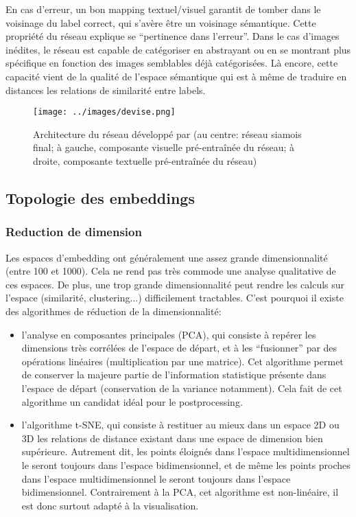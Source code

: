 \documentclass[french]{article}
\begin{document}
				En cas d'erreur, un bon mapping textuel/visuel garantit de tomber dans le voisinage du label correct, qui s'avère être un voisinage sémantique. Cette propriété du réseau explique se ``pertinence dans l'erreur''. Dans le cas d'images inédites, le réseau est capable de catégoriser en abstrayant ou en se montrant plus spécifique en fonction des images semblables déjà catégorisées. Là encore, cette capacité vient de la qualité de l'espace sémantique qui est à même de traduire en distances les relations de similarité entre labels.
				\begin{figure}[H]
					\centering
					\texttt{[image: ../images/devise.png]}
					\caption{Architecture du réseau développé par \cite{frome2013} (au centre: réseau siamois final; à gauche, composante visuelle pré-entraînée du réseau; à droite, composante textuelle pré-entraînée du réseau)}
				\end{figure}
		\subsection{Topologie des embeddings}
			\subsubsection{Reduction de dimension}
				Les espaces d'embedding ont généralement une assez grande dimensionnalité (entre 100 et 1000). Cela ne rend pas très commode une analyse qualitative de ces espaces. De plus, une trop grande dimensionnalité peut rendre les calculs sur l'espace (similarité, clustering...) difficilement tractables. C'est pourquoi il existe des algorithmes de réduction de la dimensionnalité:
				\begin{itemize}
					\item l'analyse en composantes principales (PCA), qui consiste à repérer les dimensions très corrélées de l'espace de départ, et à les ``fusionner'' par des opérations linéaires (multiplication par une matrice). Cet algorithme permet de conserver la majeure partie de l'information statistique présente dans l'espace de départ (conservation de la variance notamment). Cela fait de cet algorithme un candidat idéal pour le postprocessing.
					\item l'algorithme t-SNE, qui consiste à restituer au mieux dans un espace 2D ou 3D les relations de distance existant dans une espace de dimension bien supérieure. Autrement dit, les points éloignés dans l'espace multidimensionnel le seront toujours dans l'espace bidimensionnel, et de même les points proches dans l'espace multidimensionnel le seront toujours dans l'espace bidimensionnel. Contrairement à la PCA, cet algorithme est non-linéaire, il est donc surtout adapté à la visualisation.
				\end{itemize}
\end{document}
